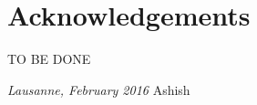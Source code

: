 \chapter*{Acknowledgements}
TO BE DONE

\bigskip
 
\noindent\textit{Lausanne, February 2016}
\hfill Ashish
